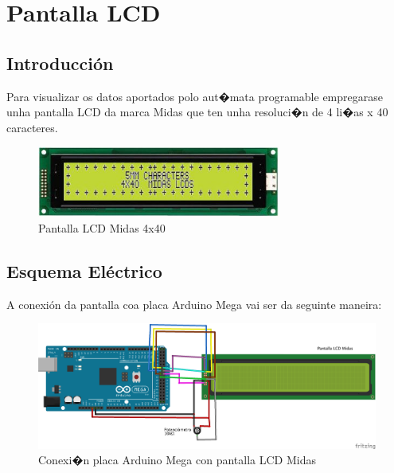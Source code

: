 \documentclass[11pt,twoside]{book}
\begin{document}
\chapter{Pantalla LCD}

\section{Introducción}

Para visualizar os datos aportados polo aut�mata programable empregarase unha pantalla LCD da marca Midas que ten unha resoluci�n de 4 li�as x 40 caracteres. 

\begin{figure}[H]
	\begin{center}
		\includegraphics[width=8cm]{images/lcd.jpg}
	\end{center}
	\caption{Pantalla LCD Midas 4x40}
	\label{fig:PantallaLCD}
\end{figure}

\section{Esquema Eléctrico}

A conexión da pantalla coa placa Arduino Mega vai ser da seguinte maneira:

\begin{figure}[H]
	\begin{center}
		\includegraphics[width=15cm]{images/conexionArduinoLCD.png}
	\end{center}
	\caption{Conexi�n placa Arduino Mega con pantalla LCD Midas}
	\label{fig:ConexionESP8266}
\end{figure}
\end{document}
